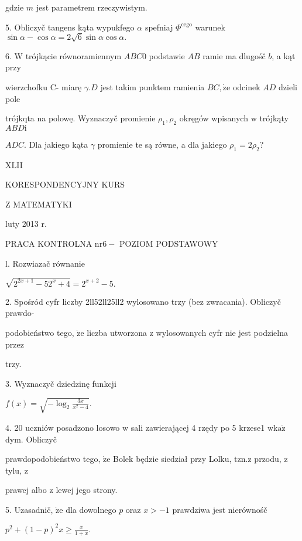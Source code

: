 \documentclass[a4paper,12pt]{article}
\begin{document}
gdzie $m$ jest parametrem rzeczywistym.

5. Obliczyč tangens kąta wypukfego $\alpha$ spefniaj $\Phi^{\mathrm{c}\mathrm{e}\mathrm{g}\mathrm{o}}$ warunek $\sin\alpha-\cos\alpha=2\sqrt{6}\sin\alpha\cos\alpha.$

6. $\mathrm{W}$ trójkącie równoramiennym $ABC0$ podstawie $AB$ ramie ma dlugośč $b$, a kąt przy

wierzchofku C- miarę $\gamma. D$ jest takim punktem ramienia $BC, \dot{\mathrm{z}}\mathrm{e}$ odcinek $AD$ dzieli pole

trójkqta na polowę. Wyznaczyč promienie $\rho_{1}, \rho_{2}$ okręgów wpisanych $\mathrm{w}$ trójkąty $ABD\mathrm{i}$

$ADC$. Dla jakiego kąta $\gamma$ promienie te są równe, a dla jakiego $\rho_{1}=2\rho_{2}$?





XLII

KORESPONDENCYJNY KURS

Z MATEMATYKI

luty 2013 r.

PRACA KONTROLNA $\mathrm{n}\mathrm{r} 6-$ POZIOM PODSTAWOWY

l. Rozwiazač równanie

$\sqrt{2^{2x+1}-52^{x}+4}=2^{x+2}-5.$

2. Spośród cyfr liczby 2ll52ll25ll2 wylosowano trzy (bez zwracania). Obliczyč prawdo-

podobieństwo tego, $\dot{\mathrm{z}}\mathrm{e}$ liczba utworzona $\mathrm{z}$ wylosowanych cyfr nie jest podzielna przez

trzy.

3. Wyznaczyč dziedzinę funkcji

$f(x)=\sqrt{-\log_{2}\frac{3x}{x^{2}-4}}.$

4. 20 uczniów posadzono losowo $\mathrm{w}$ sali zawierającej 4 rzędy po 5 krzese1 $\mathrm{w}\mathrm{k}\mathrm{a}\dot{\mathrm{z}}$ dym. Obliczyč

prawdopodobieństwo tego, $\dot{\mathrm{z}}\mathrm{e}$ Bolek będzie siedział przy Lolku, $\mathrm{t}\mathrm{z}\mathrm{n}. \mathrm{z}$ przodu, $\mathrm{z}$ tylu, $\mathrm{z}$

prawej albo $\mathrm{z}$ lewej jego strony.

5. Uzasadnič, $\dot{\mathrm{z}}\mathrm{e}$ dla dowolnego $p$ oraz $x>-1$ prawdziwa jest nierównośč

$p^{2}+(1-p)^{2}x\displaystyle \geq\frac{x}{1+x}.$
\end{document}
